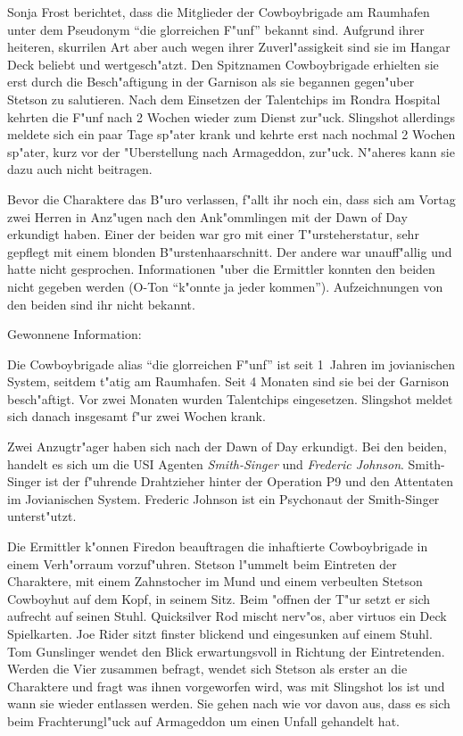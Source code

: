 Sonja Frost berichtet, dass die Mitglieder der Cowboybrigade am Raumhafen unter dem Pseudonym "`die glorreichen F"unf"' bekannt sind. Aufgrund ihrer heiteren, skurrilen Art aber auch wegen ihrer Zuverl"assigkeit sind sie im Hangar Deck beliebt und wertgesch"atzt. Den Spitznamen Cowboybrigade erhielten sie erst durch die Besch"aftigung in der Garnison als sie begannen gegen"uber Stetson zu salutieren. Nach dem Einsetzen der Talentchips im Rondra Hospital kehrten die F"unf nach 2 Wochen wieder zum Dienst zur"uck. Slingshot allerdings meldete sich ein paar Tage sp"ater krank und kehrte erst nach nochmal 2 Wochen sp"ater, kurz vor der "Uberstellung nach Armageddon, zur"uck. N"aheres kann sie dazu auch nicht beitragen. 

Bevor die Charaktere das B"uro verlassen, f"allt ihr noch ein, dass sich am Vortag zwei Herren in Anz"ugen nach den Ank"ommlingen mit der Dawn of Day erkundigt haben. Einer der beiden war gro\3 mit einer T"ursteherstatur, sehr gepflegt mit einem blonden B"urstenhaarschnitt. Der andere war unauff"allig und hatte nicht gesprochen. Informationen "uber die Ermittler konnten den beiden nicht gegeben werden (O-Ton "`k"onnte ja jeder kommen"'). Aufzeichnungen von den beiden sind ihr nicht bekannt.


\begin{remarks}
	Gewonnene Information: 
	
	Die Cowboybrigade alias "`die glorreichen F"unf"' ist seit 1\half~Jahren im jovianischen System, seitdem t"atig am Raumhafen. Seit 4 Monaten sind sie bei der Garnison besch"aftigt. Vor zwei Monaten wurden Talentchips eingesetzen. Slingshot meldet sich danach insgesamt f"ur zwei Wochen krank. 
	
	Zwei Anzugtr"ager haben sich nach der Dawn of Day erkundigt. Bei den beiden, handelt es sich um die USI Agenten \emph{Smith-Singer} und \emph{Frederic Johnson}. Smith-Singer ist der f"uhrende Drahtzieher hinter der Operation P9 und den Attentaten im Jovianischen System. Frederic Johnson ist ein Psychonaut der Smith-Singer unterst"utzt. 
\end{remarks}



Die Ermittler k"onnen Firedon beauftragen die inhaftierte Cowboybrigade in einem Verh"orraum vorzuf"uhren. Stetson l"ummelt beim Eintreten der Charaktere, mit einem Zahnstocher im Mund und einem verbeulten Stetson Cowboyhut auf dem Kopf, in seinem Sitz. Beim "offnen der T"ur setzt er sich aufrecht auf seinen Stuhl. Quicksilver Rod mischt nerv"os, aber virtuos ein Deck Spielkarten. Joe Rider sitzt finster blickend und eingesunken auf einem Stuhl. Tom Gunslinger wendet den Blick erwartungsvoll in Richtung der Eintretenden. Werden die Vier zusammen befragt, wendet sich Stetson als erster an die Charaktere und fragt was ihnen vorgeworfen wird, was mit Slingshot los ist und wann sie wieder entlassen werden. Sie gehen nach wie vor davon aus, dass es sich beim Frachterungl"uck auf Armageddon um einen Unfall gehandelt hat. 

